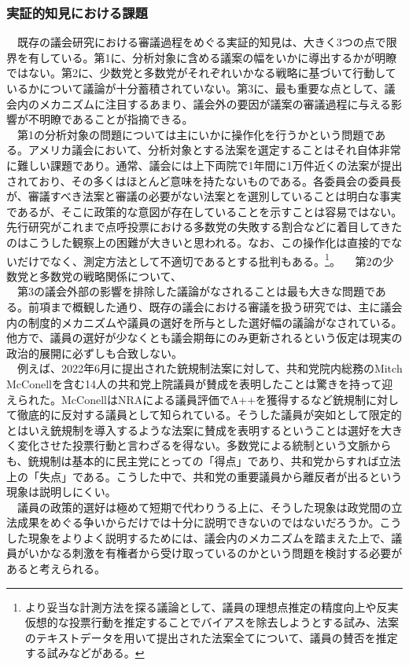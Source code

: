 \documentclass{article}
\begin{document}
\subsubsection{実証的知見における課題}
　既存の議会研究における審議過程をめぐる実証的知見は、大きく3つの点で限界を有している。第1に、分析対象に含める議案の幅をいかに導出するかが明瞭ではない。第2に、少数党と多数党がそれぞれいかなる戦略に基づいて行動しているかについて議論が十分蓄積されていない。第3に、最も重要な点として、議会内のメカニズムに注目するあまり、議会外の要因が議案の審議過程に与える影響が不明瞭であることが指摘できる。\\
　第1の分析対象の問題については主にいかに操作化を行うかという問題である。アメリカ議会において、分析対象とする法案を選定することはそれ自体非常に難しい課題であり。通常、議会には上下両院で1年間に1万件近くの法案が提出されており、その多くはほとんど意味を持たないものである。各委員会の委員長が、審議すべき法案と審議の必要がない法案とを選別していることは明白な事実であるが、そこに政策的な意図が存在していることを示すことは容易ではない。先行研究がこれまで点呼投票における多数党の失敗する割合などに着目してきたのはこうした観察上の困難が大きいと思われる。なお、この操作化は直接的でないだけでなく、測定方法として不適切であるとする批判もある。\citep*{Patterson2020-rh}\footnote{より妥当な計測方法を探る議論として、議員の理想点推定の精度向上\citep*{Stiglitz2010-zh}や反実仮想的な投票行動を推定することでバイアスを除去しようとする試み\citep*{Robinson2015-jd}、法案のテキストデータを用いて提出された法案全てについて、議員の賛否を推定する試み\citep*{Ballard2022-gi}などがある。}。
　第2の少数党と多数党の戦略関係について、\\
　第3の議会外部の影響を排除した議論がなされることは最も大きな問題である。前項まで概観した通り、既存の議会における審議を扱う研究では、主に議会内の制度的メカニズムや議員の選好を所与とした選好幅の議論がなされている。他方で、議員の選好が少なくとも議会期毎にのみ更新されるという仮定は現実の政治的展開に必ずしも合致しない。\\
　例えば、2022年6月に提出された銃規制法案に対して、共和党院内総務のMitch McConellを含む14人の共和党上院議員が賛成を表明したことは驚きを持って迎えられた。\citep*{Kapur2022-tg}McConellはNRAによる議員評価でA++を獲得するなど銃規制に対して徹底的に反対する議員として知られている。そうした議員が突如として限定的とはいえ銃規制を導入するような法案に賛成を表明するということは選好を大きく変化させた投票行動と言わざるを得ない。多数党による統制という文脈からも、銃規制は基本的に民主党にとっての「得点」であり、共和党からすれば立法上の「失点」である。こうした中で、共和党の重要議員から離反者が出るという現象は説明しにくい。\\
　議員の政策的選好は極めて短期で代わりうる上に、そうした現象は政党間の立法成果をめぐる争いからだけでは十分に説明できないのではないだろうか。こうした現象をよりよく説明するためには、議会内のメカニズムを踏まえた上で、議員がいかなる刺激を有権者から受け取っているのかという問題を検討する必要があると考えられる。\\


\end{document}
